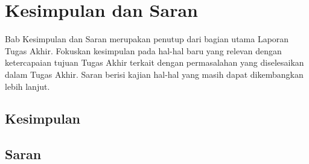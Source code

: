 \chapter{Kesimpulan dan Saran}

Bab Kesimpulan dan Saran merupakan penutup dari bagian utama Laporan Tugas Akhir. Fokuskan kesimpulan pada hal-hal baru yang relevan dengan ketercapaian tujuan Tugas Akhir terkait dengan permasalahan yang diselesaikan dalam Tugas Akhir. Saran berisi kajian hal-hal yang masih dapat dikembangkan lebih lanjut.

\section{Kesimpulan}
\blindtext

\section{Saran}
\blindtext